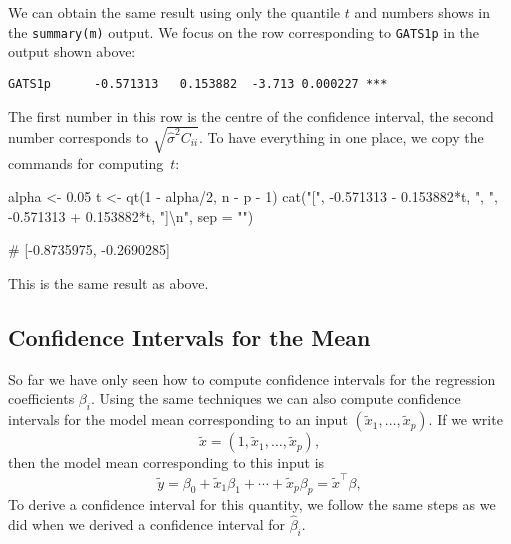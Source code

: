 \documentclass[
  a4paper,
]{article}
\newenvironment{Shaded}{\begin{snugshade}}{\end{snugshade}}
\newcommand{\AttributeTok}[1]{\textcolor[rgb]{0.77,0.63,0.00}{#1}}
\newcommand{\DecValTok}[1]{\textcolor[rgb]{0.00,0.00,0.81}{#1}}
\newcommand{\FloatTok}[1]{\textcolor[rgb]{0.00,0.00,0.81}{#1}}
\newcommand{\FunctionTok}[1]{\textcolor[rgb]{0.00,0.00,0.00}{#1}}
\newcommand{\NormalTok}[1]{#1}
\newcommand{\OtherTok}[1]{\textcolor[rgb]{0.56,0.35,0.01}{#1}}
\newcommand{\SpecialCharTok}[1]{\textcolor[rgb]{0.00,0.00,0.00}{#1}}
\newcommand{\StringTok}[1]{\textcolor[rgb]{0.31,0.60,0.02}{#1}}
\theoremstyle{definition}
\theoremstyle{definition}
\theoremstyle{definition}
\theoremstyle{definition}
\theoremstyle{remark}
\begin{document}
We can obtain the same result using only the quantile \(t\) and
numbers shows in the \texttt{summary(m)} output. We focus on the
row corresponding to \texttt{GATS1p} in the output shown above:

\begin{verbatim}
GATS1p      -0.571313   0.153882  -3.713 0.000227 ***
\end{verbatim}

The first number in this row is the centre of the confidence
interval, the second number corresponds to \(\sqrt{\hat\sigma^2 C_{ii}}\).
To have everything in one place, we copy the commands for computing~\(t\):

\begin{Shaded}
\begin{Highlighting}[]
\NormalTok{alpha }\OtherTok{\textless{}{-}} \FloatTok{0.05}
\NormalTok{t }\OtherTok{\textless{}{-}} \FunctionTok{qt}\NormalTok{(}\DecValTok{1} \SpecialCharTok{{-}}\NormalTok{ alpha}\SpecialCharTok{/}\DecValTok{2}\NormalTok{, n }\SpecialCharTok{{-}}\NormalTok{ p }\SpecialCharTok{{-}} \DecValTok{1}\NormalTok{)}
\FunctionTok{cat}\NormalTok{(}\StringTok{"["}\NormalTok{, }\SpecialCharTok{{-}}\FloatTok{0.571313} \SpecialCharTok{{-}} \FloatTok{0.153882}\SpecialCharTok{*}\NormalTok{t, }\StringTok{", "}\NormalTok{, }\SpecialCharTok{{-}}\FloatTok{0.571313} \SpecialCharTok{+} \FloatTok{0.153882}\SpecialCharTok{*}\NormalTok{t, }\StringTok{"]}\SpecialCharTok{\textbackslash{}n}\StringTok{"}\NormalTok{, }\AttributeTok{sep =} \StringTok{""}\NormalTok{)}
\end{Highlighting}
\end{Shaded}

\begin{Shaded}
\begin{Highlighting}[]
\NormalTok{\# [{-}0.8735975, {-}0.2690285]}
\end{Highlighting}
\end{Shaded}

This is the same result as above.

\hypertarget{confidence-intervals-for-the-mean}{%
\subsection{Confidence Intervals for the Mean}\label{confidence-intervals-for-the-mean}}

So far we have only seen how to compute confidence intervals for the
regression coefficients \(\beta_i\). Using the same techniques we can
also compute confidence intervals for the model mean corresponding
to an input \((\tilde x_1, \ldots, \tilde x_p)\). If we write
\begin{equation*}
  \tilde x = (1, \tilde x_1, \ldots, \tilde x_p),
\end{equation*}
then the model mean corresponding to this input is
\begin{equation*}
  \tilde y
  = \beta_0 + \tilde x_1 \beta_1 + \cdots + \tilde x_p \beta_p
  = \tilde x^\top \beta,
\end{equation*}
To derive a confidence interval for this quantity, we follow the same
steps as we did when we derived a confidence interval for \(\hat\beta_i\).
\end{document}
